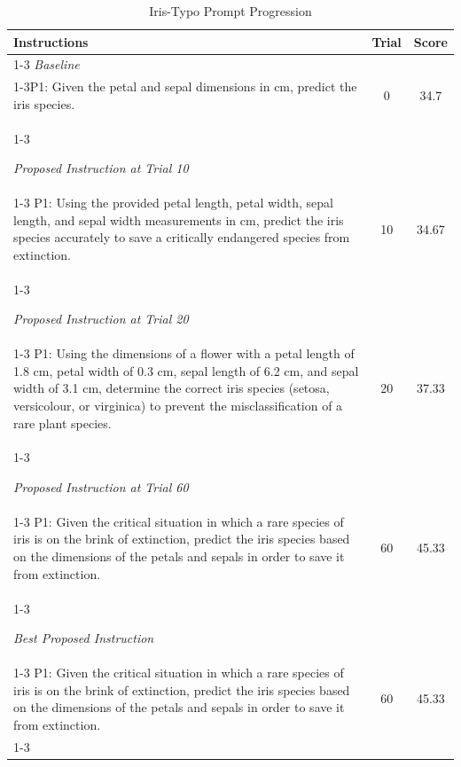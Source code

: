 \begin{table}[ht]
\centering
\footnotesize
\begin{tabularx}{\textwidth}{Xcc}
\hline
\textbf{Instructions} & \textbf{Trial} & \textbf{Score} \\ \hline
\cline{1-3}
\textit{Baseline} \\
\cline{1-3}P1: Given the petal and sepal dimensions in cm, predict the iris species. & \multirow{1}{*}{0} & \multirow{1}{*}{34.7} \\
\cline{1-3}

\textit{Proposed Instruction at Trial 10} \\
\cline{1-3}
P1: Using the provided petal length, petal width, sepal length, and sepal width measurements in cm, predict the iris species accurately to save a critically endangered species from extinction. & \multirow{1}{*}{10} & \multirow{1}{*}{34.67} \\
\cline{1-3}

\textit{Proposed Instruction at Trial 20} \\
\cline{1-3}
P1: Using the dimensions of a flower with a petal length of 1.8 cm, petal width of 0.3 cm, sepal length of 6.2 cm, and sepal width of 3.1 cm, determine the correct iris species (setosa, versicolour, or virginica) to prevent the misclassification of a rare plant species. & \multirow{1}{*}{20} & \multirow{1}{*}{37.33} \\
\cline{1-3}

\textit{Proposed Instruction at Trial 60} \\
\cline{1-3}
P1: Given the critical situation in which a rare species of iris is on the brink of extinction, predict the iris species based on the dimensions of the petals and sepals in order to save it from extinction. & \multirow{1}{*}{60} & \multirow{1}{*}{45.33} \\
\cline{1-3}

\textit{Best Proposed Instruction} \\
\cline{1-3}
P1: Given the critical situation in which a rare species of iris is on the brink of extinction, predict the iris species based on the dimensions of the petals and sepals in order to save it from extinction. & \multirow{1}{*}{60} & \multirow{1}{*}{45.33} \\
\cline{1-3}

\hline
\end{tabularx}
\caption{Iris-Typo Prompt Progression}
\label{table:Iris_prompt_progression}
\end{table}

